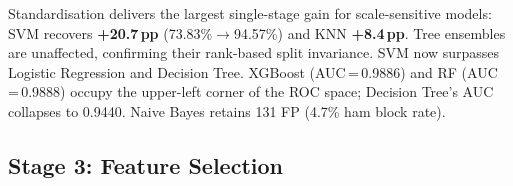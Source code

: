 \documentclass[conference]{IEEEtran}
\begin{document}
\begin{table}[htbp]
\caption{Standardised Baseline (\texttt{StandardScaler};
3,680/921 split; natural class distribution)}
\label{tab:baseline}
\centering
{}
\end{table}

Standardisation delivers the largest single-stage gain for
scale-sensitive models: SVM recovers \textbf{+20.7\,pp}
(73.83\%$\to$94.57\%) and KNN \textbf{+8.4\,pp}. Tree ensembles
are unaffected, confirming their rank-based split invariance.
SVM now surpasses Logistic Regression and Decision Tree.
XGBoost (AUC\,=\,0.9886) and RF (AUC\,=\,0.9888) occupy the
upper-left corner of the ROC space; Decision Tree's AUC collapses to 0.9440.
Naive Bayes retains 131 FP (4.7\% ham block rate).

\subsection{Stage 3: Feature Selection}
\end{document}
